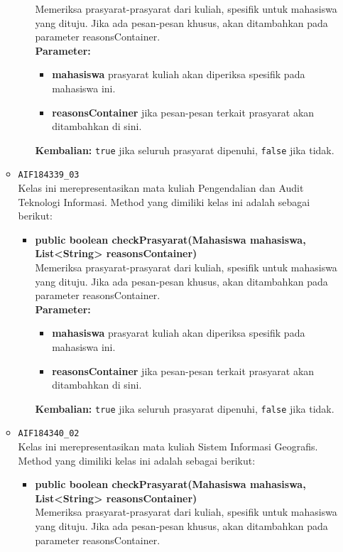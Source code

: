 \begin{enumerate}
\begin{itemize}
\begin{itemize}
			Memeriksa prasyarat-prasyarat dari kuliah, spesifik untuk mahasiswa yang dituju. Jika ada pesan-pesan khusus, akan ditambahkan pada parameter reasonsContainer.\\
			\textbf{Parameter:}
			\begin{itemize}
				\item \textbf{mahasiswa} prasyarat kuliah akan diperiksa spesifik pada mahasiswa ini.
				\item \textbf{reasonsContainer} jika pesan-pesan terkait prasyarat akan ditambahkan di sini.
			\end{itemize}
			\textbf{Kembalian:} \texttt{true} jika seluruh prasyarat dipenuhi, \texttt{false} jika tidak.
		\end{itemize}
		\item \texttt{AIF184339\_03} \\
		Kelas ini merepresentasikan mata kuliah Pengendalian dan Audit Teknologi Informasi. Method yang dimiliki kelas ini adalah sebagai berikut: 
		\begin{itemize}
			\item \textbf{public boolean checkPrasyarat(Mahasiswa mahasiswa, List<String> reasonsContainer)}\\
			Memeriksa prasyarat-prasyarat dari kuliah, spesifik untuk mahasiswa yang dituju. Jika ada pesan-pesan khusus, akan ditambahkan pada parameter reasonsContainer.\\
			\textbf{Parameter:}
			\begin{itemize}
				\item \textbf{mahasiswa} prasyarat kuliah akan diperiksa spesifik pada mahasiswa ini.
				\item \textbf{reasonsContainer} jika pesan-pesan terkait prasyarat akan ditambahkan di sini.
			\end{itemize}
			\textbf{Kembalian:} \texttt{true} jika seluruh prasyarat dipenuhi, \texttt{false} jika tidak.
		\end{itemize}
		\item \texttt{AIF184340\_02} \\
		Kelas ini merepresentasikan mata kuliah Sistem Informasi Geografis. Method yang dimiliki kelas ini adalah sebagai berikut: 
		\begin{itemize}
			\item \textbf{public boolean checkPrasyarat(Mahasiswa mahasiswa, List<String> reasonsContainer)}\\
			Memeriksa prasyarat-prasyarat dari kuliah, spesifik untuk mahasiswa yang dituju. Jika ada pesan-pesan khusus, akan ditambahkan pada parameter reasonsContainer.\\

\end{itemize}
\end{itemize}
\end{enumerate}
